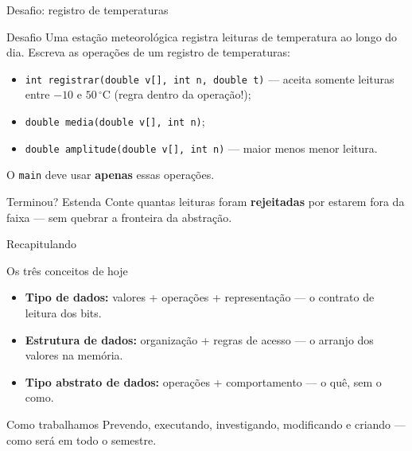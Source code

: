 \documentclass[aspectratio=169]{beamer}
\begin{document}
\begin{frame}[shrink=8]{Desafio: registro de temperaturas}
  \begin{block}{Desafio}
    Uma estação meteorológica registra leituras de temperatura ao longo do
    dia. Escreva as operações de um registro de temperaturas:
    \begin{itemize}
      \item \texttt{int registrar(double v[], int n, double t)} --- aceita
        somente leituras entre $-10$ e $50\,^{\circ}$C (regra dentro da
        operação!);
      \item \texttt{double media(double v[], int n)};
      \item \texttt{double amplitude(double v[], int n)} --- maior menos
        menor leitura.
    \end{itemize}
    O \texttt{main} deve usar \textbf{apenas} essas operações.
  \end{block}
  \begin{exampleblock}{Terminou? Estenda}
    Conte quantas leituras foram \textbf{rejeitadas} por estarem fora da
    faixa --- sem quebrar a fronteira da abstração.
  \end{exampleblock}
\end{frame}

\begin{frame}{Recapitulando}
  \begin{block}{Os três conceitos de hoje}
    \begin{itemize}
      \item \textbf{Tipo de dados:} valores + operações + representação ---
        o contrato de leitura dos bits.
      \item \textbf{Estrutura de dados:} organização + regras de acesso ---
        o arranjo dos valores na memória.
      \item \textbf{Tipo abstrato de dados:} operações + comportamento ---
        o quê, sem o como.
    \end{itemize}
  \end{block}
  \begin{exampleblock}{Como trabalhamos}
    Prevendo, executando, investigando, modificando e criando --- como será
    em todo o semestre.
  \end{exampleblock}
\end{frame}
\end{document}
